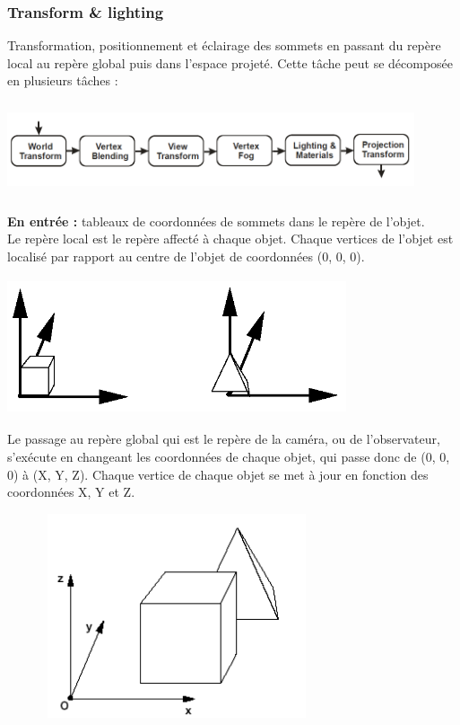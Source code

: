 \subsubsection{Transform \& lighting}
Transformation, positionnement et éclairage des sommets en passant du repère local au repère global puis dans l’espace projeté.
Cette tâche peut se décomposée en plusieurs tâches :\\
\includegraphics[width=12cm,height=35mm]{leo/images/T&L.png}\\
\textbf{En entrée :} tableaux de coordonnées de sommets dans le repère de l’objet.\\
Le repère local est le repère affecté à chaque objet. Chaque vertices de l’objet est localisé par rapport au centre de l’objet de coordonnées (0, 0, 0).\\
\begin{center}
\includegraphics[width=10cm,height=40mm]{leo/images/repereLocal.png}
\end{center}
Le passage au repère global qui est le repère de la caméra, ou de l’observateur, s’exécute en changeant les coordonnées de chaque objet, qui passe donc de (0, 0, 0) à (X, Y, Z). Chaque vertice de chaque objet se met à jour en fonction des coordonnées X, Y et Z. \\
\begin{center}
\includegraphics[width=10cm,height=60mm]{leo/images/repereGlobal.png}\\
\end{center}
